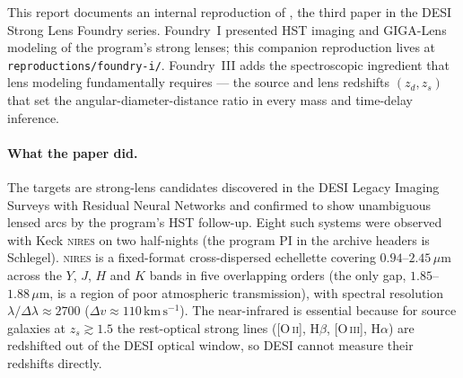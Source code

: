 \documentclass[11pt,letterpaper]{article}
\newcommand{\zs}{\ensuremath{z_s}}
\newcommand{\zd}{\ensuremath{z_d}}
\newcommand{\micron}{\ensuremath{\,\mu\mathrm{m}}}
\newcommand{\kms}{\ensuremath{\,\mathrm{km\,s^{-1}}}}
\newcommand{\NIRES}{\textsc{nires}}
\begin{document}
This report documents an internal reproduction of
\citet{agarwal2025foundry3}, the third paper in the DESI Strong Lens
Foundry series. Foundry~I \citep{huang2025foundry1} presented HST imaging
and GIGA-Lens \citep{gu2022gigalens} modeling of the program's strong
lenses; this companion reproduction lives at
\texttt{reproductions/foundry-i/}. Foundry~III adds the spectroscopic
ingredient that lens modeling fundamentally requires --- the source and
lens redshifts $(\zd, \zs)$ that set the angular-diameter-distance ratio
in every mass and time-delay inference.

\paragraph{What the paper did.} The targets are strong-lens candidates
discovered in the DESI Legacy Imaging Surveys with Residual Neural
Networks \citep{huang2020decals,huang2021decals2} and confirmed to show
unambiguous lensed arcs by the program's HST follow-up. Eight such
systems were observed with Keck \NIRES{} \citep{wilson2004nires} on two
half-nights (the program PI in the archive headers is Schlegel).
\NIRES{} is a fixed-format cross-dispersed echellette covering
$0.94$--$2.45\micron$ across the $Y$, $J$, $H$ and $K$ bands in five
overlapping orders (the only gap, $1.85$--$1.88\micron$, is a region of
poor atmospheric transmission), with spectral resolution
$\lambda/\Delta\lambda \approx 2700$ ($\Delta v \approx 110\kms$). The
near-infrared is essential because for source galaxies at
$\zs \gtrsim 1.5$ the rest-optical strong lines ([O\,\textsc{ii}],
H$\beta$, [O\,\textsc{iii}], H$\alpha$) are redshifted out of the DESI
optical window, so DESI cannot measure their redshifts directly.
\end{document}
